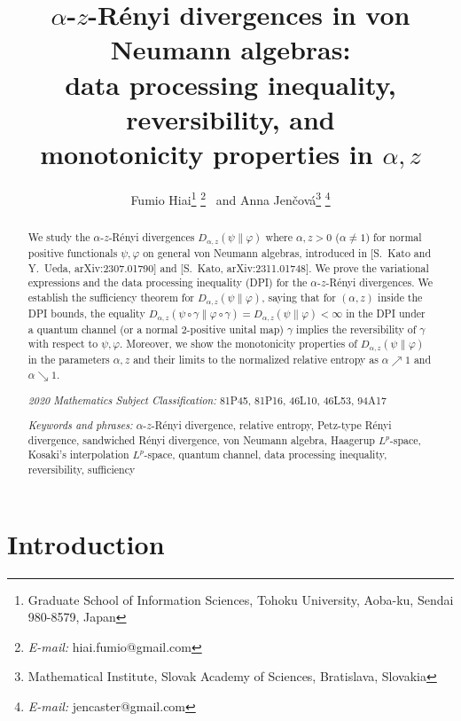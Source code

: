\documentclass[12pt]{article}
\title{
$\alpha$-$z$-R\'enyi divergences in von Neumann algebras: \\
data processing inequality, reversibility, and \\
monotonicity properties in $\alpha,z$}
\author{Fumio Hiai\footnote{Graduate School of Information Sciences, Tohoku University,
Aoba-ku, Sendai 980-8579, Japan}
\footnote{{\it E-mail:} hiai.fumio@gmail.com} \
and Anna Jen\v cov\'a\footnote{Mathematical Institute, Slovak Academy
of Sciences, Bratislava, Slovakia}
\footnote{{\it E-mail:} jencaster@gmail.com}}
\theoremstyle{definition}
\theoremstyle{remark}
\numberwithin{equation}{section}
\def\ffi{\varphi}
\begin{document}
\maketitle

\begin{abstract}
{We study the $\alpha$-$z$-R\'enyi divergences $D_{\alpha,z}(\psi\|\ffi)$ where $\alpha,z>0$ ($\alpha\ne1$)
for normal positive functionals $\psi,\ffi$ on general von Neumann
algebras, introduced in [S.~Kato and Y.~Ueda, arXiv:2307.01790] and [S.~Kato, arXiv:2311.01748].
We prove the variational expressions and the data processing inequality (DPI)
for the $\alpha$-$z$-R\'enyi divergences. We establish the sufficiency theorem for $D_{\alpha,z}(\psi\|\ffi)$,
saying that for $(\alpha,z)$ inside the DPI bounds, the equality
$D_{\alpha,z}(\psi\circ\gamma\|\ffi\circ\gamma)=D_{\alpha,z}(\psi\|\ffi)<\infty$ in the DPI under
a quantum channel (or a normal $2$-positive unital map) $\gamma$ implies the reversibility of
$\gamma$ with respect to $\psi,\ffi$. Moreover, we show the monotonicity properties of
$D_{\alpha,z}(\psi\|\ffi)$ in the parameters $\alpha,z$ and their limits to the normalized relative entropy as
$\alpha\nearrow1$ and $\alpha\searrow1$.}

\bigskip\noindent
{\it 2020 Mathematics Subject Classification:}
81P45, 81P16, 46L10, 46L53, 94A17

\medskip\noindent
{\it Keywords and phrases:}
$\alpha$-$z$-R\'enyi divergence,
relative entropy,
Petz-type R\'enyi divergence,
sandwiched R\'enyi divergence,
von Neumann algebra,
Haagerup $L^p$-space,
Kosaki's interpolation $L^p$-space,
quantum channel,
data processing inequality,
reversibility,
sufficiency

\end{abstract}



\section{Introduction}
\end{document}
